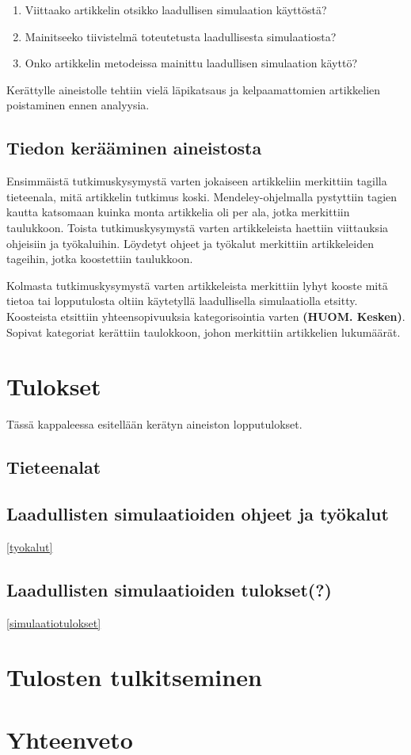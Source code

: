 \documentclass[utf8]{gradu3}
\begin{document}
\begin{enumerate}
    \item Viittaako artikkelin otsikko laadullisen simulaation käyttöstä?
    \item Mainitseeko tiivistelmä toteutetusta laadullisesta simulaatiosta?
    \item Onko artikkelin metodeissa mainittu laadullisen simulaation käyttö?
\end{enumerate}

Kerättylle aineistolle tehtiin vielä läpikatsaus ja kelpaamattomien artikkelien poistaminen ennen analyysia.

\section{Tiedon kerääminen aineistosta} \label{aineiston analysointi}
Ensimmäistä tutkimuskysymystä varten jokaiseen artikkeliin merkittiin tagilla tieteenala, mitä artikkelin tutkimus koski. Mendeley-ohjelmalla pystyttiin tagien kautta katsomaan kuinka monta artikkelia oli per ala, jotka merkittiin taulukkoon. Toista tutkimuskysymystä varten artikkeleista haettiin viittauksia ohjeisiin ja työkaluihin. Löydetyt ohjeet ja työkalut merkittiin artikkeleiden tageihin, jotka koostettiin taulukkoon.

Kolmasta tutkimuskysymystä varten artikkeleista merkittiin lyhyt kooste mitä tietoa tai lopputulosta oltiin käytetyllä laadullisella simulaatiolla etsitty. Koosteista etsittiin yhteensopivuuksia kategorisointia varten \textbf{(HUOM. Kesken)}. Sopivat kategoriat kerättiin taulokkoon, johon merkittiin artikkelien lukumäärät.

\chapter{Tulokset}
Tässä kappaleessa esitellään kerätyn aineiston lopputulokset.

\section{Tieteenalat} \label{tieteenalat}

\section{Laadullisten simulaatioiden ohjeet ja työkalut} \ref{tyokalut}

\section{Laadullisten simulaatioiden tulokset(?)} \ref{simulaatiotulokset}

\chapter{Tulosten tulkitseminen}


\chapter{Yhteenveto}


\printbibliography
\end{document}
